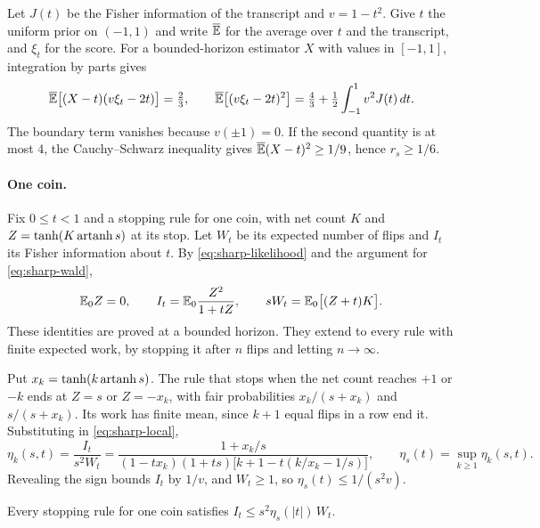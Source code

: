 Let $J(t)$ be the Fisher information of the transcript and $v=1-t^2$.
Give $t$ the uniform prior on $(-1,1)$ and write $\overline{\mathbb E}$ for the
average over $t$ and the transcript, and $\xi_t$ for the score. For a
bounded-horizon estimator $X$ with values in $[-1,1]$, integration by
parts gives
\begin{equation}\label{eq:sharp-score}
 \overline{\mathbb E}\bigl[(X-t)(v\xi_t-2t)\bigr]=\tfrac23,\qquad
 \overline{\mathbb E}\bigl[(v\xi_t-2t)^2\bigr]
 =\tfrac43+\tfrac12\int_{-1}^1v^2J(t)\,dt .
\end{equation}
The boundary term vanishes because $v(\pm1)=0$. If the second quantity is
at most $4$, the Cauchy--Schwarz inequality gives
$\overline{\mathbb E}(X-t)^2\ge1/9$, hence $r_s\ge1/6$.

\paragraph{One coin.}
Fix $0\le t<1$ and a stopping rule for one coin, with net count $K$ and
$Z=\tanh(K\operatorname{artanh} s)$ at its stop. Let $W_t$ be its expected number of
flips and $I_t$ its Fisher information about $t$. By
\eqref{eq:sharp-likelihood} and the argument for \eqref{eq:sharp-wald},
\begin{equation}\label{eq:sharp-local}
 \mathbb E_0Z=0,\qquad I_t=\mathbb E_0\frac{Z^2}{1+tZ},\qquad
 sW_t=\mathbb E_0\bigl[(Z+t)K\bigr].
\end{equation}
These identities are proved at a bounded horizon. They extend to every
rule with finite expected work, by stopping it after $n$ flips and letting
$n\to\infty$.

Put $x_k=\tanh(k\operatorname{artanh} s)$. The rule that stops when the net count
reaches $+1$ or $-k$ ends at $Z=s$ or $Z=-x_k$, with fair probabilities
$x_k/(s+x_k)$ and $s/(s+x_k)$. Its work has finite mean, since $k+1$ equal
flips in a row end it. Substituting in \eqref{eq:sharp-local},
\begin{equation}\label{eq:sharp-exit}
 \eta_k(s,t)=\frac{I_t}{s^2W_t}
 =\frac{1+x_k/s}{(1-tx_k)(1+ts)\bigl[k+1-t(k/x_k-1/s)\bigr]},
 \qquad \eta_s(t)=\sup_{k\ge1}\eta_k(s,t).
\end{equation}
Revealing the sign bounds $I_t$ by $1/v$, and $W_t\ge1$, so
$\eta_s(t)\le1/(s^2v)$.

\begin{lemma}\label{lem:sharp-price}
Every stopping rule for one coin satisfies $I_t\le s^2\eta_s(|t|)\,W_t$.
\end{lemma}

